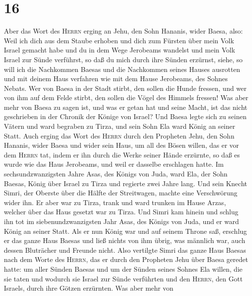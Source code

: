 \hypertarget{section-15}{%
\section{16}\label{section-15}}

 Aber das Wort des \textsc{Herrn} erging an Jehu, den Sohn
Hananis, wider Baesa, also:  Weil ich dich aus dem Staube
erhoben und dich zum Fürsten über mein Volk Israel gemacht habe und du
in dem Wege Jerobeams wandelst und mein Volk Israel zur Sünde verführst,
so daß du mich durch ihre Sünden erzürnst,  siehe, so will
ich die Nachkommen Baesas und die Nachkommen seines Hauses ausrotten und
mit deinem Haus verfahren wie mit dem Hause Jerobeams, des Sohnes
Nebats.  Wer von Baesa in der Stadt stirbt, den sollen die
Hunde fressen, und wer von ihm auf dem Felde stirbt, den sollen die
Vögel des Himmels fressen!  Was aber mehr von Baesa zu
sagen ist, und was er getan hat und seine Macht, ist das nicht
geschrieben in der Chronik der Könige von Israel?  Und
Baesa legte sich zu seinen Vätern und ward begraben zu Tirza, und sein
Sohn Ela ward König an seiner Statt.  Auch erging das Wort
des \textsc{Herrn} durch den Propheten Jehu, den Sohn Hananis, wider
Baesa und wider sein Haus, um all des Bösen willen, das er vor dem
\textsc{Herrn} tat, indem er ihn durch die Werke seiner Hände erzürnte,
so daß es wurde wie das Haus Jerobeams, und weil er dasselbe erschlagen
hatte.  Im sechsundzwanzigsten Jahre Asas, des Königs von
Juda, ward Ela, der Sohn Baesas, König über Israel zu Tirza und regierte
zwei Jahre lang.  Und sein Knecht Simri, der Oberste über
die Hälfte der Streitwagen, machte eine Verschwörung wider ihn. Er aber
war zu Tirza, trank und ward trunken im Hause Arzas, welcher über das
Haus gesetzt war zu Tirza.  Und Simri kam hinein und
schlug ihn tot im siebenundzwanzigsten Jahr Asas, des Königs von Juda,
und er ward König an seiner Statt.  Als er nun König war
und auf seinem Throne saß, erschlug er das ganze Haus Baesas und ließ
nichts von ihm übrig, was männlich war, auch dessen Bluträcher und
Freunde nicht.  Also vertilgte Simri das ganze Haus
Baesas nach dem Worte des \textsc{Herrn}, das er durch den Propheten
Jehu über Baesa geredet hatte:  um aller Sünden Baesas
und um der Sünden seines Sohnes Ela willen, die sie taten und wodurch
sie Israel zur Sünde verführten und den \textsc{Herrn}, den Gott
Israels, durch ihre Götzen erzürnten.  Was aber mehr von
